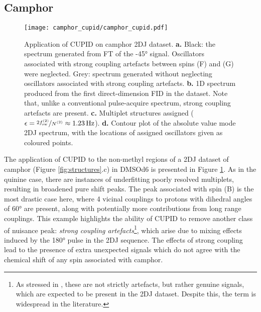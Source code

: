 \subsection{Camphor}
\begin{figure}%
    \centering%
    \texttt{[image: camphor\_cupid/camphor\_cupid.pdf]}%
    \caption[
        Application of \acs{CUPID} on a camphor dataset.
    ]{
        Application of \acs{CUPID} on camphor \ac{2DJ} dataset.
        \textbf{a.} Black: the spectrum generated from \ac{FT} of the \ang{-45}
        signal. Oscillators associated with strong coupling artefacts between
        spins (F) and (G) were neglected. Grey: spectrum generated without
        neglecting oscillators associated with strong coupling artefacts.
        \textbf{b.} \acs{1D} spectrum produced from the first direct-dimension
        \ac{FID} in the dataset. Note that, unlike a conventional pulse-acquire
        spectrum, strong coupling artefacts are present.
        \textbf{c.} Multiplet structures assigned ($\epsilon =
        \nicefrac{2 f_{\mathrm{sw}}^{(2)}}{N^{(2)}} \approx \qty{1.23}{\hertz}$).
        \textbf{d.} Contour plot of the absolute value mode \acs{2DJ} spectrum,
        with the locations of assigned oscillators given as coloured points.
    }
    \label{fig:camphor-cupid}%
\end{figure}%
The application of \ac{CUPID} to the non-methyl regions of a \ac{2DJ}
dataset of camphor (Figure \ref{fig:structures}.c) in \acs{DMSOd6} is presented
in Figure \ref{fig:camphor-cupid}. As in the quinine case, there are instances
of underfitting poorly resolved multiplets, resulting in broadened pure shift peaks.
The peak associated with spin (B) is the most drastic case here, where 4
vicinal couplings to protons with dihedral angles of \ang{60} are present,
along with potentially more contributions from long range couplings.
This example highlights the ability of \ac{CUPID} to remove another class of nuisance peak: \emph{strong coupling artefacts}\footnote{
    As stressed in \cite{Thrippleton2005}, these are not strictly artefacts,
    but rather genuine signals, which are expected to be present in the
    \ac{2DJ} dataset. Despite this, the term is widespread in the literature.
},
which arise due to mixing effects induced by the \ang{180} pulse in the
\ac{2DJ} sequence\cite{Thrippleton2005,Wider1983}.
The effects of strong coupling lead to the presence of extra unexpected signals
which do not agree with the chemical shift of any spin associated with camphor.
